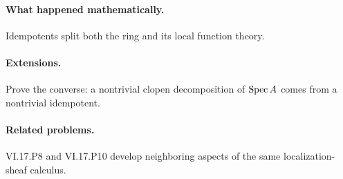 \paragraph{What happened mathematically.}
Idempotents split both the ring and its local function theory.

\paragraph{Extensions.}
Prove the converse: a nontrivial clopen decomposition of $\operatorname{Spec} A$ comes from a nontrivial idempotent.

\paragraph{Related problems.}
VI.17.P8 and VI.17.P10 develop neighboring aspects of the same localization-sheaf calculus.
\fi
